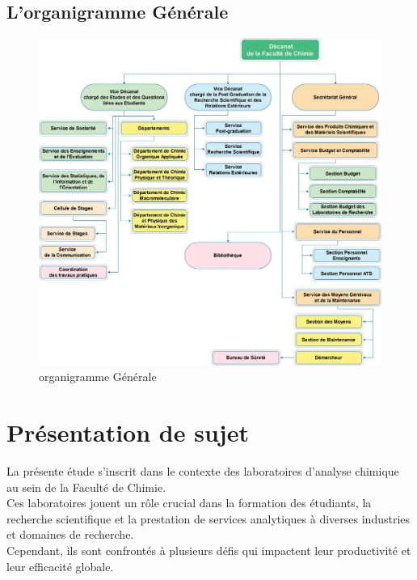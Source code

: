 \subsection{L’organigramme Générale }

\begin{figure}[hbtp]
  \centering
  \includegraphics[width=.9\paperwidth]{images/org-gen.jpg}
  \caption{organigramme Générale}
  \label{fig:organigramme Générale}
\end{figure}
\newpage
\section{Présentation de sujet}
La présente étude s'inscrit dans le contexte des laboratoires d'analyse chimique au sein de la Faculté de Chimie.\\
 Ces laboratoires jouent un rôle crucial dans la formation des étudiants, 
 la recherche scientifique et la prestation de services analytiques à diverses industries et domaines de recherche.\\
 Cependant, ils sont confrontés à plusieurs défis qui impactent leur productivité et leur efficacité globale.
